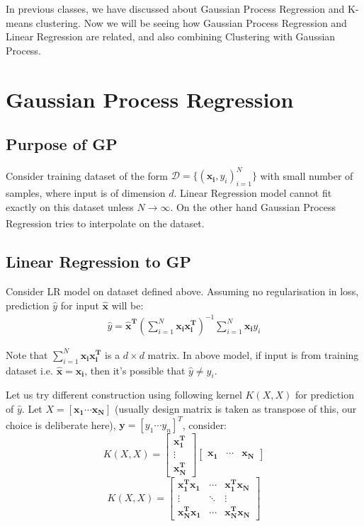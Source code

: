 \documentclass[12pt]{article}
\begin{document}
\MakeScribeTop

In previous classes, we have discussed about Gaussian Process Regression and K-means clustering. Now we will be seeing how Gaussian Process Regression and Linear Regression are related, and also combining Clustering with Gaussian Process.

\section{Gaussian Process Regression}

\subsection{Purpose of GP}
Consider training dataset of the form $\mathcal{D} = \{(\mathbf{x_i}, y_i)_{i=1}^N\}$ with small number of samples, where input is of dimension $d$. Linear Regression model cannot fit exactly on this dataset unless $N \xrightarrow[]{} \infty$. On the other hand Gaussian Process Regression tries to interpolate on the dataset.

\subsection{Linear Regression to GP}
Consider LR model on dataset defined above. Assuming no regularisation in loss, prediction $\hat{y}$ for input $\mathbf{\hat{x}}$ will be:
\begin{align}
    \hat{y} = \mathbf{\hat{x}^T} (\sum_{i=1}^N \mathbf{x_i x_i^T})^{-1} \sum_{i=1}^N\mathbf{x_i}y_i
\end{align}

Note that $\sum_{i=1}^N \mathbf{x_i x_i^T}$ is a $d\times d$ matrix. In above model, if input is from training dataset i.e. $\mathbf{\hat{x}=x_i}$, then it's possible that $\hat{y} \neq y_i$. 

Let us try different construction using following kernel $K(X,X)$ for prediction of $\hat{y}$. Let $X = [\mathbf{x_1} \cdots \mathbf{x_N}]$ (usually design matrix is taken as transpose of this, our choice is deliberate here), $\mathbf{y} = [y_1 \cdots y_n]^T$, consider:
\[
    K(X,X) = \begin{bmatrix}
            \mathbf{x_1^T}\\
            \vdots \\
            \mathbf{x_N^T}
        \end{bmatrix}
        \begin{bmatrix}
            \mathbf{x_1} & \cdots & \mathbf{x_N}
        \end{bmatrix}
\]
\[
    K(X,X) = \begin{bmatrix}
            \mathbf{x_1^Tx_1} & \cdots & \mathbf{x_1^Tx_N}\\
            \vdots  & \ddots & \vdots \\
            \mathbf{x_N^Tx_1} & \cdots & \mathbf{x_N^Tx_N}
        \end{bmatrix}
\]
\end{document}
